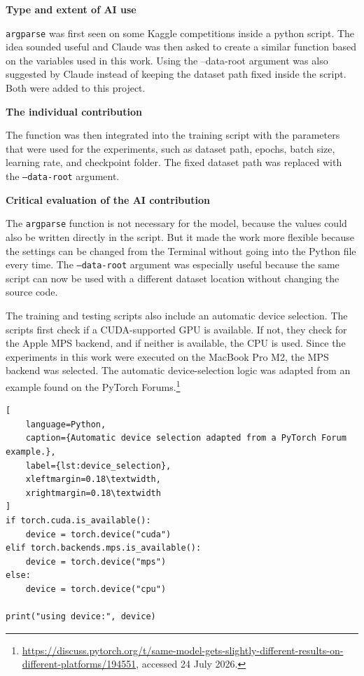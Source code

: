 \begin{tcolorbox}[
    colback=gray!15,
    colframe=gray!50,
    boxrule=0.5pt
]

\textbf{Type and extent of AI use}

 \texttt{argparse} was first seen on some Kaggle competitions inside a python script. The idea sounded useful and Claude was then asked to create a similar function based on the
variables used in this work. Using the –data-root argument was also suggested by Claude instead of keeping the dataset path fixed inside the script.  Both were added to this project.

\vspace{0.4cm}

\textbf{The individual contribution}

The function was then integrated into the training script with the parameters that were used for the experiments, such as dataset path, epochs, batch size, learning rate, and checkpoint folder. 
The fixed dataset path was replaced with the \texttt{--data-root} argument.

\vspace{0.4cm}

\textbf{Critical evaluation of the AI contribution}

The \texttt{argparse} function is not necessary for the model, because the values could also be written directly in the script. But it made the work more flexible because the settings can be changed from the Terminal without going into the Python file every time. The \texttt{--data-root} argument was especially useful because the same script can now be used with a different dataset location without changing the source code.
\end{tcolorbox}

The training and testing scripts also include an automatic device selection. The scripts first check if a CUDA-supported GPU is available. If not, they check for the Apple MPS backend, and if neither is available, the CPU is used. Since the experiments in this work were executed on the MacBook Pro M2, the MPS backend was selected. The automatic device-selection logic was adapted from an example found on the PyTorch Forums.\footnote{\url{https://discuss.pytorch.org/t/same-model-gets-slightly-different-results-on-different-platforms/194551}, accessed 24 July 2026.}

\begin{lstlisting}[
    language=Python,
    caption={Automatic device selection adapted from a PyTorch Forum example.},
    label={lst:device_selection},
    xleftmargin=0.18\textwidth,
    xrightmargin=0.18\textwidth
]
if torch.cuda.is_available():
    device = torch.device("cuda")
elif torch.backends.mps.is_available():
    device = torch.device("mps")
else:
    device = torch.device("cpu")

print("using device:", device)
\end{lstlisting}

